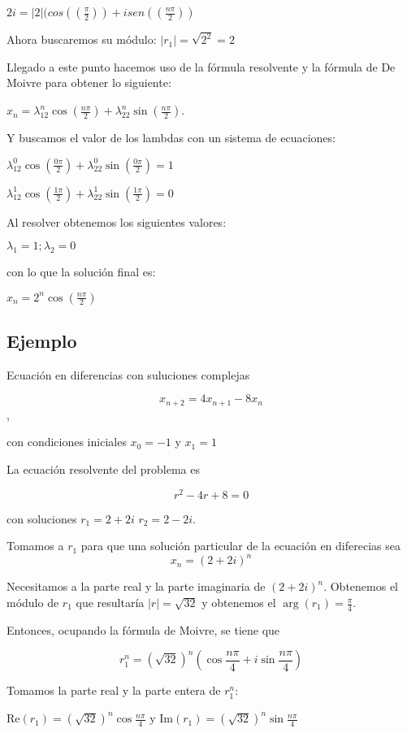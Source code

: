 \documentclass{report}
\begin{document}
$2i=|2|(cos((\frac{\pi}{2}))+isen((\frac{n\pi}{2}))$


Ahora buscaremos su módulo: $|r_{1}|=\sqrt{2^2}=2$

Llegado a este punto hacemos uso de la fórmula resolvente y la fórmula de De Moivre para obtener lo siguiente:

$x_n=\lambda_12^n\cos(\frac{n\pi}{2})+\lambda_22^n\sin(\frac{n\pi}{2})$.


Y buscamos el valor de los lambdas con un sistema de ecuaciones:

$\lambda_12^0\cos(\frac{0\pi}{2})+\lambda_22^0\sin(\frac{0\pi}{2})=1$

$\lambda_12^1\cos(\frac{1\pi}{2})+\lambda_22^1\sin(\frac{1\pi}{2})=0$

Al resolver obtenemos los siguientes valores:

$\lambda_1=1;\lambda_2=0$

con lo que la solución final es:

$x_n=2^n\cos(\frac{n\pi}{2})$
\bigskip
\bigskip
\subsection{Ejemplo}

Ecuación en diferencias con suluciones complejas

$$x_{n+2}=4x_{n+1}-8x_{n}$$,

con condiciones iniciales $x_{0}=-1$ y $x_{1}=1$

 La ecuación resolvente del problema es

 $$r^2-4r+8=0$$

 con soluciones $r_{1}=2+2i$ $r_{2}=2-2i$.

\bigskip

 Tomamos a $r_{1}$ para que una solución particular de la ecuación en diferecias sea $$x_{n}=(2+2i)^n$$

Necesitamos a la parte real y la parte imaginaria de $(2+2i)^n$. Obtenemos el módulo de $r_{1}$ que resultaría $|r|= \sqrt{32}$ y obtenemos el $\arg(r_{1})=\frac{\pi}{4}$.

Entonces, ocupando la fórmula de Moivre, se tiene que

$$r_{1}^n=(\sqrt{32})^n(\cos{\frac{n\pi}{4}}+i\sin{\frac{n\pi}{4}})$$


Tomamos la parte real y la parte entera de $r_{1}^n$:

$\mathrm{Re}(r_{1})=(\sqrt{32})^n\cos{\frac{n\pi}{4}}$ y $\mathrm{Im}(r_{1})=(\sqrt{32})^n\sin{\frac{n\pi}{4}}$
\end{document}
